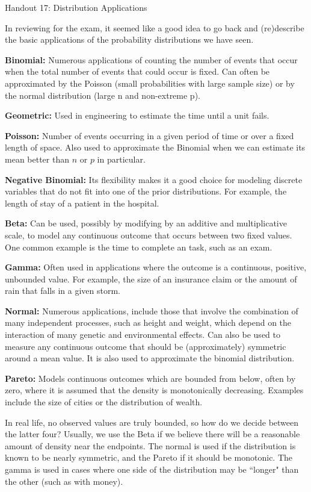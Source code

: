 \documentclass{tufte-handout}
\begin{document}
\justify

{\LARGE Handout 17: Distribution Applications}

\vspace*{18pt}

\noindent

In reviewing for the exam, it seemed like a good idea to go back and (re)describe
the basic applications of the probability distributions we have seen.

\textbf{Binomial:} Numerous applications of counting the number of events that
occur when the total number of events that could occur is fixed. Can often be
approximated by the Poisson (small probabilities with large sample size) or by
the normal distribution (large n and non-extreme p).

\textbf{Geometric:} Used in engineering to estimate the time until a unit fails.

\textbf{Poisson:} Number of events occurring in a given period of time or over
a fixed length of space. Also used to approximate the Binomial when we can estimate
its mean better than $n$ or $p$ in particular.

\textbf{Negative Binomial:} Its flexibility makes it a good choice for modeling
discrete variables that do not fit into one of the prior distributions. For example,
the length of stay of a patient in the hospital.

\textbf{Beta:} Can be used, possibly by modifying by an additive and multiplicative
scale, to model any continuous outcome that occurs between two fixed values. One
common example is the time to complete an task, such as an exam.

\textbf{Gamma:} Often used in applications where the outcome is a continuous, positive,
unbounded value. For example, the size of an insurance claim or the amount of
rain that falls in a given storm.

\textbf{Normal:} Numerous applications, include those that involve the combination
of many independent processes, such as height and weight, which depend on the interaction
of many genetic and environmental effects. Can also be used to measure any continuous
outcome that should be (approximately) symmetric around a mean value. It is also used
to approximate the binomial distribution.

\textbf{Pareto:} Models continuous outcomes which are bounded from below, often by
zero, where it is assumed that the density is monotonically decreasing. Examples include
the size of cities or the distribution of wealth.

In real life, no observed values are truly bounded, so how do we decide between the
latter four? Usually, we use the Beta if we believe there will be a reasonable amount
of density near the endpoints. The normal is used if the distribution is known to be
nearly symmetric, and the Pareto if it should be monotonic. The gamma is used in cases
where one side of the distribution may be ``longer" than the other (such as with money).
\end{document}
